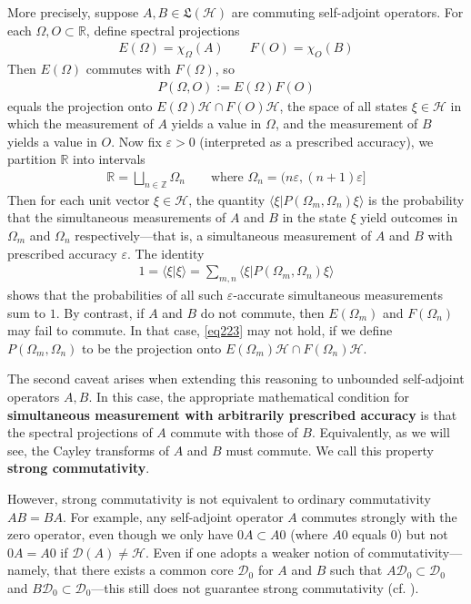 \documentclass[12pt,b5paper,notitlepage]{article}
\theoremstyle{definition}
\theoremstyle{plain}
\newcommand{\fk}{\mathfrak}
\newcommand{\Dom}{\mathscr{D}}
\newcommand{\bk}[1]{\langle {#1}\rangle}
\newcommand{\Zbb}{\mathbb Z}
\newcommand{\Rbb}{\mathbb R}
\newcommand{\eps}{\varepsilon}
\newcommand{\MH}{\mathcal H}
\numberwithin{equation}{section}
\begin{document}
More precisely, suppose $A,B\in\fk L(\MH)$ are commuting self-adjoint operators. For each $\Omega,O\subset\Rbb$, define spectral projections
\begin{align*}
E(\Omega)=\chi_{\Omega}(A)\qquad F(O)=\chi_O(B)
\end{align*}
Then $E(\Omega)$ commutes with $F(\Omega)$, so
\begin{align*}
P(\Omega,O):=E(\Omega)F(O)
\end{align*}
equals the projection onto $E(\Omega)\MH\cap F(O)\MH$, the space of all states $\xi\in\MH$ in which the measurement of $A$ yields a value in $\Omega$, and the measurement of $B$ yields a value in $O$. Now fix $\eps>0$ (interpreted as a prescribed accuracy), we partition $\Rbb$ into intervals
\begin{align*}
\Rbb=\bigsqcup_{n\in\Zbb}\Omega_n\qquad\text{where }\Omega_n=(n\eps,(n+1)\eps]
\end{align*}
Then for each unit vector $\xi\in\MH$, the quantity $\bk{\xi|P(\Omega_m,\Omega_n)\xi}$ is the probability that the simultaneous measurements of $A$ and $B$ in the state $\xi$ yield outcomes in $\Omega_m$ and $\Omega_n$ respectively---that is, a simultaneous measurement of $A$ and $B$ with prescribed accuracy $\eps$. The identity
\begin{align}\label{eq223}
1=\bk{\xi|\xi}=\sum_{m,n}\bk{\xi|P(\Omega_m,\Omega_n)\xi}
\end{align}
shows that the probabilities of all such $\eps$-accurate simultaneous measurements sum to $1$. By contrast, if $A$ and $B$ do not commute, then $E(\Omega_m)$ and $F(\Omega_n)$ may fail to commute. In that case, \eqref{eq223} may not hold, if we define $P(\Omega_m,\Omega_n)$ to be the projection onto $E(\Omega_m)\MH\cap F(\Omega_n)\MH$.


The second caveat arises when extending this reasoning to unbounded self-adjoint operators $A,B$. In this case, the appropriate mathematical condition for \textbf{simultaneous measurement with arbitrarily prescribed accuracy} is that the spectral projections of $A$ commute with those of $B$. Equivalently, as we will see, the Cayley transforms of $A$ and $B$ must commute. We call this property \textbf{strong commutativity}. 

However, strong commutativity is not equivalent to ordinary commutativity $AB=BA$. For example, any self-adjoint operator $A$ commutes strongly with the zero operator, even though we only have $0A\subset A0$ (where $A0$ equals $0$) but not $0A=A0$ if $\Dom(A)\neq\MH$. Even if one adopts a weaker notion of commutativity---namely, that there exists a common core $\Dom_0$ for $A$ and $B$ such that $A\Dom_0\subset \Dom_0$ and $B\Dom_0\subset \Dom_0$---this still does not guarantee strong commutativity (cf. \cite[Sec. VIII.5]{RS-1}).
\end{document}
